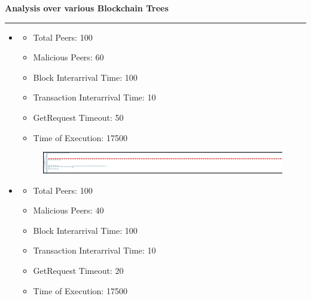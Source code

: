 \documentclass[a4paper,12pt]{article}
\newenvironment{solution}[2][]{%
\begin{mdframed}[linecolor=blue!70!black, linewidth=2pt, roundcorner=10pt, backgroundcolor=yellow!10!white, skipabove=12pt, skipbelow=12pt]%
	\textbf{\large #2}
	\par\noindent\rule{\textwidth}{0.4pt}
}{
\end{mdframed}
}
\begin{document}
\begin{solution}{Analysis over various Blockchain Trees}
\begin{itemize}
	
					\item \begin{itemize}
						\vspace{-7pt}
						\item Total Peers: 100
						\vspace{-7pt}
						\item Malicious Peers: 60
						\vspace{-7pt}
						\item Block Interarrival Time: 100
						\vspace{-7pt}
						\item Transaction Interarrival Time: 10
						\vspace{-7pt}
						\item GetRequest Timeout: 50 
						\vspace{-7pt}
						\item Time of Execution: 17500
					\end{itemize}
				
					 \begin{figure}[H]
							\centering
							\includegraphics[width=\textwidth]{images/i_100_60_10_100_50_SE.png} 
						\end{figure}
	
		\item \begin{itemize}
			\vspace{-7pt}
			\item Total Peers: 100
			\vspace{-7pt}
			\item Malicious Peers: 40
			\vspace{-7pt}
			\item Block Interarrival Time: 100
			\vspace{-7pt}
			\item Transaction Interarrival Time: 10
			\vspace{-7pt}
			\item GetRequest Timeout: 20 
			\vspace{-7pt}
			\item Time of Execution: 17500
		\end{itemize}
	

\end{itemize}
\end{solution}
\end{document}
